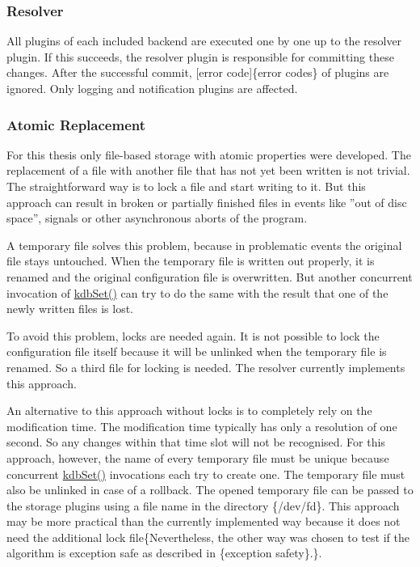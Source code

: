 \subsubsection*{Resolver}

All plugins of each included backend are executed one by one up to the resolver plugin. If this succeeds, the resolver plugin is responsible for committing these changes. After the successful commit, \mbox{[}error code\mbox{]}\{error codes\} of plugins are ignored. Only logging and notification plugins are affected.

\subsubsection*{Atomic Replacement}

For this thesis only file-\/based storage with atomic properties were developed. The replacement of a file with another file that has not yet been written is not trivial. The straightforward way is to lock a file and start writing to it. But this approach can result in broken or partially finished files in events like ''out of disc space'', signals or other asynchronous aborts of the program.

A temporary file solves this problem, because in problematic events the original file stays untouched. When the temporary file is written out properly, it is renamed and the original configuration file is overwritten. But another concurrent invocation of {\ttfamily \hyperlink{group__kdb_ga11436b058408f83d303ca5e996832bcf}{kdb\+Set()}} can try to do the same with the result that one of the newly written files is lost.

To avoid this problem, locks are needed again. It is not possible to lock the configuration file itself because it will be unlinked when the temporary file is renamed. So a third file for locking is needed. The resolver currently implements this approach.

An alternative to this approach without locks is to completely rely on the modification time. The modification time typically has only a resolution of one second. So any changes within that time slot will not be recognised. For this approach, however, the name of every temporary file must be unique because concurrent {\ttfamily \hyperlink{group__kdb_ga11436b058408f83d303ca5e996832bcf}{kdb\+Set()}} invocations each try to create one. The temporary file must also be unlinked in case of a rollback. The opened temporary file can be passed to the storage plugins using a file name in the directory \{/dev/fd\}. This approach may be more practical than the currently implemented way because it does not need the additional lock file\{Nevertheless, the other way was chosen to test if the algorithm is exception safe as described in \{exception safety\}.\}.


